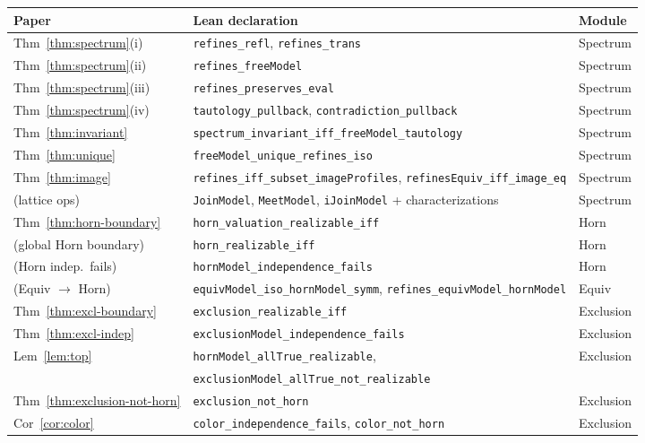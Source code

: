 \documentclass[10pt, letterpaper]{article}
\theoremstyle{remark}
\newcommand{\lean}[1]{\texttt{#1}}
\begin{document}
\begin{center}
\small
\begin{tabular}{@{}lll@{}}
\toprule
Paper & Lean declaration & Module \\
\midrule
Thm~\ref{thm:spectrum}(i) & \lean{refines\_refl}, \lean{refines\_trans} & Spectrum \\
Thm~\ref{thm:spectrum}(ii) & \lean{refines\_freeModel} & Spectrum \\
Thm~\ref{thm:spectrum}(iii) & \lean{refines\_preserves\_eval} & Spectrum \\
Thm~\ref{thm:spectrum}(iv) & \lean{tautology\_pullback}, \lean{contradiction\_pullback} & Spectrum \\
Thm~\ref{thm:invariant} & \lean{spectrum\_invariant\_iff\_freeModel\_tautology} & Spectrum \\
Thm~\ref{thm:unique} & \lean{freeModel\_unique\_refines\_iso} & Spectrum \\
Thm~\ref{thm:image} & \lean{refines\_iff\_subset\_imageProfiles}, \lean{refinesEquiv\_iff\_image\_eq} & Spectrum \\
(lattice ops) & \lean{JoinModel}, \lean{MeetModel}, \lean{iJoinModel} + characterizations & Spectrum \\
Thm~\ref{thm:horn-boundary} & \lean{horn\_valuation\_realizable\_iff} & Horn \\
(global Horn boundary) & \lean{horn\_realizable\_iff} & Horn \\
(Horn indep.\ fails) & \lean{hornModel\_independence\_fails} & Horn \\
(Equiv $\to$ Horn) & \lean{equivModel\_iso\_hornModel\_symm}, \lean{refines\_equivModel\_hornModel} & Equiv \\
Thm~\ref{thm:excl-boundary} & \lean{exclusion\_realizable\_iff} & Exclusion \\
Thm~\ref{thm:excl-indep} & \lean{exclusionModel\_independence\_fails} & Exclusion \\
Lem~\ref{lem:top} & \lean{hornModel\_allTrue\_realizable}, & Exclusion \\
 & \lean{exclusionModel\_allTrue\_not\_realizable} & \\
Thm~\ref{thm:exclusion-not-horn} & \lean{exclusion\_not\_horn} & Exclusion \\
Cor~\ref{cor:color} & \lean{color\_independence\_fails}, \lean{color\_not\_horn} & Exclusion \\
\bottomrule
\end{tabular}
\end{center}



\end{document}
